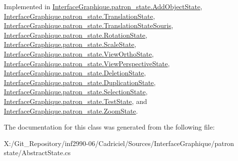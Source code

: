 Implemented in \hyperlink{class_interface_graphique_1_1patron__state_1_1_add_object_state_a5f251f4a42b766f424c3e31af3d181b3}{Interface\-Graphique.\-patron\-\_\-state.\-Add\-Object\-State}, \hyperlink{class_interface_graphique_1_1patron__state_1_1_translation_state_ab5ba5dd1c3941c219f81d01dbcfe2a60}{Interface\-Graphique.\-patron\-\_\-state.\-Translation\-State}, \hyperlink{class_interface_graphique_1_1patron__state_1_1_translation_state_souris_a2370ab1d0a55afefdd46eda17dc13ce6}{Interface\-Graphique.\-patron\-\_\-state.\-Translation\-State\-Souris}, \hyperlink{class_interface_graphique_1_1patron__state_1_1_rotation_state_aa115b089fcafb2b25b8a27f19b55ef31}{Interface\-Graphique.\-patron\-\_\-state.\-Rotation\-State}, \hyperlink{class_interface_graphique_1_1patron__state_1_1_scale_state_af8fe6bca0517beed3c6b9106886d7408}{Interface\-Graphique.\-patron\-\_\-state.\-Scale\-State}, \hyperlink{class_interface_graphique_1_1patron__state_1_1_view_ortho_state_aae857294a6d4030392e0009f869bb46e}{Interface\-Graphique.\-patron\-\_\-state.\-View\-Ortho\-State}, \hyperlink{class_interface_graphique_1_1patron__state_1_1_view_perspective_state_a111b6675fe8e49465a5ba6eb49b4081f}{Interface\-Graphique.\-patron\-\_\-state.\-View\-Perspective\-State}, \hyperlink{class_interface_graphique_1_1patron__state_1_1_deletion_state_ab720f529b212ff1b98d5e97f7fcb199f}{Interface\-Graphique.\-patron\-\_\-state.\-Deletion\-State}, \hyperlink{class_interface_graphique_1_1patron__state_1_1_duplication_state_a3e4ab1c3a8bd3d03b822c66d7597e068}{Interface\-Graphique.\-patron\-\_\-state.\-Duplication\-State}, \hyperlink{class_interface_graphique_1_1patron__state_1_1_selection_state_a3c9a95b047d8ef642d0ac7662347f65e}{Interface\-Graphique.\-patron\-\_\-state.\-Selection\-State}, \hyperlink{class_interface_graphique_1_1patron__state_1_1_test_state_ab7aa954cce22801d52158f3d70cbdcac}{Interface\-Graphique.\-patron\-\_\-state.\-Test\-State}, and \hyperlink{class_interface_graphique_1_1patron__state_1_1_zoom_state_aa4608434efc2a14431b08ba9ba071633}{Interface\-Graphique.\-patron\-\_\-state.\-Zoom\-State}.



The documentation for this class was generated from the following file\-:\begin{DoxyCompactItemize}
\item 
X\-:/\-Git\-\_\-\-Repository/inf2990-\/06/\-Cadriciel/\-Sources/\-Interface\-Graphique/patron state/Abstract\-State.\-cs\end{DoxyCompactItemize}
